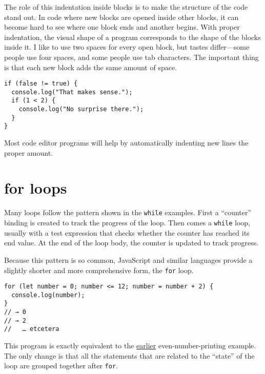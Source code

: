 The role of this indentation inside blocks is to make the structure of the code stand out. In code where new blocks are opened inside other blocks, it can become hard to see where one block ends and another begins. With proper indentation, the visual shape of a program corresponds to the shape of the blocks inside it. I like to use two spaces for every open block, but tastes differ—some people use four spaces, and some people use tab characters. The important thing is that each new block adds the same amount of space.

\begin{lstlisting}
if (false != true) {
  console.log("That makes sense.");
  if (1 < 2) {
    console.log("No surprise there.");
  }
}
\end{lstlisting}
\noindent

Most code editor programs will help by automatically indenting new lines the proper amount.

\section{for loops}

Many loops follow the pattern shown in the \lstinline`while` examples. First a ``counter'' binding is created to track the progress of the loop. Then comes a \lstinline`while` loop, usually with a test expression that checks whether the counter has reached its end value. At the end of the loop body, the counter is updated to track progress.

Because this pattern is so common, JavaScript and similar languages provide a slightly shorter and more comprehensive form, the \lstinline`for` loop.

\begin{lstlisting}
for (let number = 0; number <= 12; number = number + 2) {
  console.log(number);
}
// → 0
// → 2
//   … etcetera
\end{lstlisting}
\noindent{}

This program is exactly equivalent to the \hyperref[program_structure.loops]{earlier} even-number-printing example. The only change is that all the statements that are related to the ``state'' of the loop are grouped together after \lstinline`for`.

